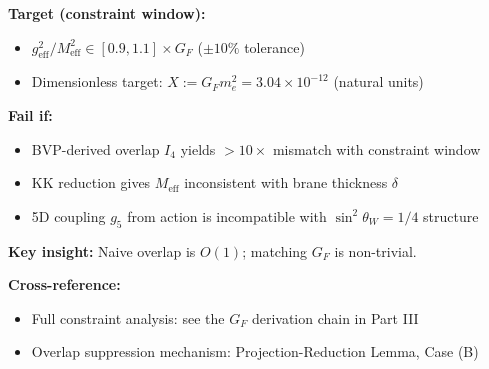 \begin{tcolorbox}[falsifiability, title=\textbf{Falsification Channel: Fermi Constant}]
\textbf{Target (constraint window):}
\begin{itemize}[nosep]
    \item $g_{\text{eff}}^2 / M_{\text{eff}}^2 \in [0.9, 1.1] \times G_F$ \hfill ($\pm 10\%$ tolerance)
    \item Dimensionless target: $X := G_F m_e^2 = 3.04 \times 10^{-12}$ \hfill (natural units)
\end{itemize}

\textbf{Fail if:}
\begin{itemize}[nosep]
    \item BVP-derived overlap $I_4$ yields $>10\times$ mismatch with constraint window
    \item KK reduction gives $M_{\text{eff}}$ inconsistent with brane thickness $\delta$
    \item 5D coupling $g_5$ from action is incompatible with $\sin^2\theta_W = 1/4$ structure
\end{itemize}

\textbf{Key insight:} Naive overlap is $O(1)$; matching $G_F$ is non-trivial.

\textbf{Cross-reference:}
\begin{itemize}[nosep]
    \item Full constraint analysis: see the $G_F$ derivation chain in Part III
    \item Overlap suppression mechanism: Projection-Reduction Lemma, Case (B)
\end{itemize}
\end{tcolorbox}

